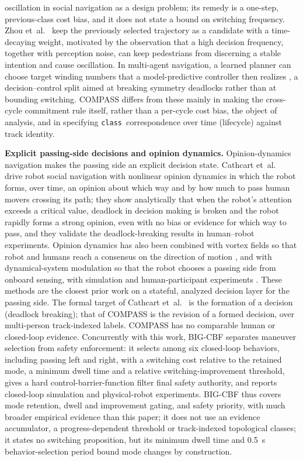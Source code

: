 \documentclass[11pt]{article}
\newcommand{\Class}{\texttt{class}}
\begin{document}
oscillation in social navigation as a design problem; its remedy is a one-step, previous-class cost bias, and it does not state a bound on switching frequency. Zhou et~al.~\cite{zhou2023minimally} keep the previously selected trajectory as a candidate with a time-decaying weight, motivated by the observation that a high decision frequency, together with perception noise, can keep pedestrians from discerning a stable intention and cause oscillation. In multi-agent navigation, a learned planner can choose target winding numbers that a model-predictive controller then realizes \cite{nakao2025wnummpc}, a decision--control split aimed at breaking symmetry deadlocks rather than at bounding switching. COMPASS differs from these mainly in making the cross-cycle commitment rule itself, rather than a per-cycle cost bias, the object of analysis, and in specifying \Class\ correspondence over time (lifecycle) against track identity.

\textbf{Explicit passing-side decisions and opinion dynamics.} Opinion-dynamics navigation makes the passing side an explicit decision state. Cathcart et~al.~\cite{cathcart2023opinion} drive robot social navigation with nonlinear opinion dynamics in which the robot forms, over time, an opinion about which way and by how much to pass human movers crossing its path; they show analytically that when the robot's attention exceeds a critical value, deadlock in decision making is broken and the robot rapidly forms a strong opinion, even with no bias or evidence for which way to pass, and they validate the deadlock-breaking results in human--robot experiments. Opinion dynamics has also been combined with vortex fields so that robot and humans reach a consensus on the direction of motion \cite{daddato2024oval}, and with dynamical-system modulation so that the robot chooses a passing side from onboard sensing, with simulation and human-participant experiments \cite{chen2025socialdsm}. These methods are the closest prior work on a stateful, analyzed decision layer for the passing side. The formal target of Cathcart et~al.~\cite{cathcart2023opinion} is the formation of a decision (deadlock breaking); that of COMPASS is the revision of a formed decision, over multi-person track-indexed labels. COMPASS has no comparable human or closed-loop evidence. Concurrently with this work, BIG-CBF \cite{li2026bigcbf} separates maneuver selection from safety enforcement: it selects among six closed-loop behaviors, including passing left and right, with a switching cost relative to the retained mode, a minimum dwell time and a relative switching-improvement threshold, gives a hard control-barrier-function filter final safety authority, and reports closed-loop simulation and physical-robot experiments. BIG-CBF thus covers mode retention, dwell and improvement gating, and safety priority, with much broader empirical evidence than this paper; it does not use an evidence accumulator, a progress-dependent threshold or track-indexed topological classes; it states no switching proposition, but its minimum dwell time and 0.5~s behavior-selection period bound mode changes by construction.
\end{document}
